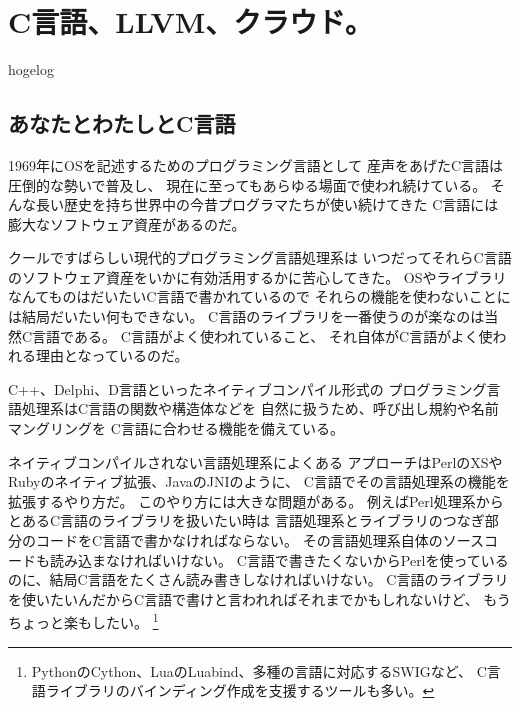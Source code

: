 
\chapter{C言語、LLVM、クラウド。}

\begin{flushright}
 {\headfont hogelog}
\end{flushright}

\section{あなたとわたしとC言語}
1969年にOSを記述するためのプログラミング言語として
産声をあげたC言語は圧倒的な勢いで普及し、
現在に至ってもあらゆる場面で使われ続けている。
そんな長い歴史を持ち世界中の今昔プログラマたちが使い続けてきた
C言語には膨大なソフトウェア資産があるのだ。

クールですばらしい現代的プログラミング言語処理系は
いつだってそれらC言語のソフトウェア資産をいかに有効活用するかに苦心してきた。
OSやライブラリなんてものはだいたいC言語で書かれているので
それらの機能を使わないことには結局だいたい何もできない。
C言語のライブラリを一番使うのが楽なのは当然C言語である。
C言語がよく使われていること、
それ自体がC言語がよく使われる理由となっているのだ。

C++、Delphi、D言語といったネイティブコンパイル形式の
プログラミング言語処理系はC言語の関数や構造体などを
自然に扱うため、呼び出し規約や名前マングリングを
C言語に合わせる機能を備えている。

ネイティブコンパイルされない言語処理系によくある
アプローチはPerlのXSやRubyのネイティブ拡張、JavaのJNIのように、
C言語でその言語処理系の機能を拡張するやり方だ。
このやり方には大きな問題がある。
例えばPerl処理系からとあるC言語のライブラリを扱いたい時は
言語処理系とライブラリのつなぎ部分のコードをC言語で書かなければならない。
その言語処理系自体のソースコードも読み込まなければいけない。
C言語で書きたくないからPerlを使っているのに、結局C言語をたくさん読み書きしなければいけない。
C言語のライブラリを使いたいんだからC言語で書けと言われればそれまでかもしれないけど、
もうちょっと楽もしたい。
\footnote{
PythonのCython、LuaのLuabind、多種の言語に対応するSWIGなど、
C言語ライブラリのバインディング作成を支援するツールも多い。}

